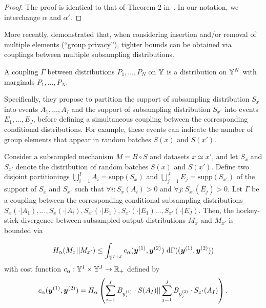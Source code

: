 \begin{proof}
    The proof is identical to that of Theorem 2 in~\cite{balle2018privacy}. In our notation, we interchange $\alpha$ and $\alpha'$.
\end{proof}

More recently, \citet{schuchardt2024unified} demonstrated that, when considering insertion and/or removal of multiple elements (``group privacy''), tighter bounds can be obtained via couplings between multiple subsampling distributions.
\begin{definition}
    A coupling $\Gamma$ between distributions $P_1, \dots, P_N$ on ${\mathbb{Y}}$ is a distribution on ${\mathbb{Y}}^N$ with marginals $P_1,\dots, P_N$. 
\end{definition}
Specifically, they propose to partition the support of subsampling distribution $S_x$ into events $A_1,\dots,A_I$ and the support of subsampling distribution $S_{x'}$ into events $E_1,\dots,E_J$, before defining a simultaneous coupling between the corresponding conditional distributions.
For example, these events can indicate the number of group elements that appear in random batches $S(x)$ and $S(x')$.
\begin{lemma}\label{lemma:coupling_bound}
    Consider a subsampled mechanism $M = B \circ S$ and datasets $x \simeq x'$, 
    and let $S_x$ and $S_{x'}$ denote the distribution of random batches $S(x)$ and $S(x')$. 
    Define two disjoint partitionings $\bigcup_{i=1}^I A_i = \mathrm{supp}(S_x)$ and $\bigcup_{j=1}^J E_j = \mathrm{supp}(S_{x'})$ of the support of $S_x$ and $S_{x'}$ such that
    $\forall i: S_x(A_i) > 0$ and $\forall j : S_{x'}(E_j) > 0$.
    Let $\Gamma$ be a coupling between the corresponding conditional subsampling distributions
    $S_x(\cdot | A_1), \dots, S_x(\cdot | A_i), S_{x'}(\cdot | E_1), S_{x'}(\cdot | E_1) \dots, S_{x'}(\cdot | E_J)$.
    Then, the hockey-stick divergence between subsampled output distributions $M_x$ and $M_{x'}$ is bounded via 
\end{lemma}
\begin{equation*}
    H_\alpha(M_x || M_{x'}) \leq \int_{{\mathbb{Y}}^{I+J}} c_\alpha({\bm{y}}^{(1)}, {\bm{y}}^{(2)}) \ \mathrm{d} \Gamma(({\bm{y}}^{(1)}, {\bm{y}}^{(2)}))
\end{equation*}
with cost function $c_\alpha : {\mathbb{Y}}^{I} \times {\mathbb{Y}}^{J} \rightarrow {\mathbb{R}}_+$ defined by
\begin{equation}\label{eq:cost_function}
    c_\alpha({\bm{y}}^{(1)}, {\bm{y}}^{(2)}) = H_\alpha\left(\sum_{i=1}^{I} B_{y^{(1)}_i} \cdot S(A_I) || \sum_{j=1}^{J} B_{y^{(2)}_j} \cdot S_{x'}(A_I) \right).
\end{equation}
